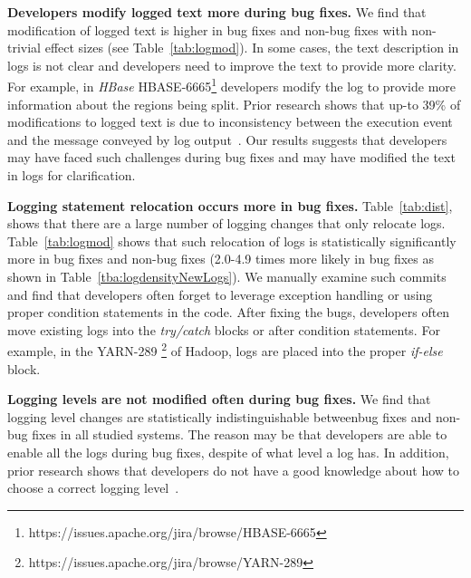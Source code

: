  
\textbf{Developers modify logged text more during bug fixes.} We find that modification of logged text is higher in bug fixes and non-bug fixes with non-trivial effect sizes (see Table~\ref{tab:logmod}). In some cases, the text description in logs is not clear and developers need to improve the text to provide more clarity. For example, in \emph{HBase} HBASE-6665\footnote{https://issues.apache.org/jira/browse/HBASE-6665} developers modify the log to provide more information about the regions being split. Prior research shows that up-to 39\% of modifications to logged text is due to inconsistency between the execution event and the message conveyed by log output~\cite{Characterizinglogs}. Our results suggests that developers may have faced such challenges during bug fixes and may have modified the text in logs for clarification. 


\textbf{Logging statement relocation occurs more in bug fixes.} Table~\ref{tab:dist}, shows that there are a large number of logging changes that only relocate logs. Table~\ref{tab:logmod} shows that such relocation of logs is statistically significantly more in bug fixes and non-bug fixes (2.0-4.9 times more likely in bug fixes as shown in Table~\ref{tba:logdensityNewLogs}). We manually examine such commits and find that developers often forget to leverage exception handling or using proper condition statements in the code. After fixing the bugs, developers often move existing logs into the \emph{try/catch} blocks or after condition statements. For example, in the YARN-289 \footnote{https://issues.apache.org/jira/browse/YARN-289} of Hadoop, logs are placed into the proper \emph{if-else} block.

\textbf{Logging levels are not modified often during bug fixes.} We find that logging level changes are statistically indistinguishable betweenbug fixes and non-bug fixes in all studied systems. The reason may be that developers are able to enable all the logs during bug fixes, despite of what level a log has. In addition, prior research shows that developers do not have a good knowledge about how to choose a correct logging level~\cite{Characterizinglogs}. 



